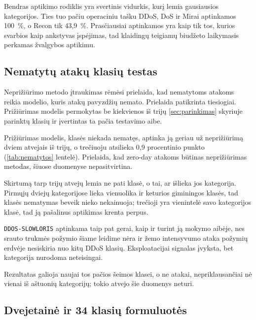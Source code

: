 Bendras aptikimo rodiklis yra svertinis vidurkis, kurį lemia gausiausios
kategorijos. Ties tuo pačiu operaciniu tašku DDoS, DoS ir Mirai
aptinkamos 100~\%, o Recon tik 43,9~\%. Prasčiausiai aptinkamos yra kaip
tik tos, kurios svarbios kaip ankstyvas įspėjimas, tad klaidingų
teigiamų biudžeto laikymasis perkamas žvalgybos aptikimu.


\subsection{Nematytų atakų klasių testas}
\label{sec:nematytos}

Neprižiūrimo metodo įtraukimas rėmėsi prielaida, kad nematytoms atakoms
reikia modelio, kuris atakų pavyzdžių nemato. Prielaida patikrinta
tiesiogiai. Prižiūrimas modelis permokytas be kiekvienos iš trijų
\ref{sec:parinkimas} skyriuje parinktų klasių ir įvertintas ta pačia
testavimo aibe.

\begin{table}[htbp]
\centering
\caption{Nematytų atakų klasių aptikimas testavimo aibėje.}
\label{tab:nematytos}
\end{table}

Prižiūrimas modelis, klasės niekada nematęs, aptinka ją geriau už
neprižiūrimą dviem atvejais iš trijų, o trečiuoju atsilieka
0,9 procentinio punkto (\ref{tab:nematytos} lentelė). Prielaida, kad
zero-day atakoms būtinas neprižiūrimas metodas, šiuose duomenyse
nepasitvirtina.

Skirtumą tarp trijų atvejų lemia ne pati klasė, o tai, ar išlieka jos
kategorija. Pirmųjų dviejų kategorijose lieka vienuolika ir keturios
giminingos klasės, tad klasės nematymas beveik nieko nekainuoja;
trečioji yra vienintelė savo kategorijos klasė, tad ją pašalinus
aptikimas krenta perpus.

\texttt{DDOS-SLOWLORIS} aptinkama taip pat gerai, kaip ir turint ją
mokymo aibėje, nes srauto trukmės požymio šiame leidime nėra ir žemo
intensyvumo ataka požymių erdvėje nesiskiria nuo kitų DDoS klasių.
Eksploatacijai signalas įvyksta, bet kategorija nurodoma neteisingai.

Rezultatas galioja naujai tos pačios šeimos klasei, o ne atakai,
nepriklausančiai nė vienai iš aštuonių kategorijų; tokio atvejo šie
duomenys neturi.


\subsection{Dvejetainė ir 34 klasių formuluotės}
\label{sec:formuluotes}

